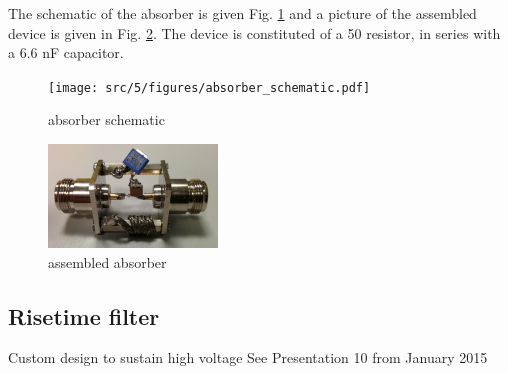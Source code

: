 The schematic of the absorber is given Fig. \ref{fig:absorber_schematic} and a picture of the assembled device is given in Fig. \ref{pic:absorber_filter_assembled}.
The device is constituted of a 50\textOmega{} resistor, in series with a 6.6 nF capacitor.

\begin{figure}[!h]
  \centering
  \texttt{[image: src/5/figures/absorber\_schematic.pdf]}
  \caption{absorber schematic}
  \label{fig:absorber_schematic}
\end{figure}

\begin{figure}[!h]
  \centering
  \includegraphics[width=0.4\textwidth]{src/5/figures/absorber.jpg}
  \caption{assembled absorber}
  \label{pic:absorber_filter_assembled}
\end{figure}

\subsection{Risetime filter}
Custom design to sustain high voltage
See Presentation 10 from January 2015
